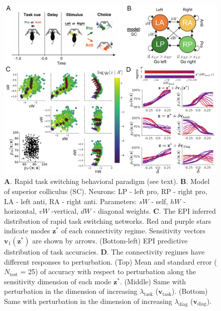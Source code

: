 \documentclass[11pt]{article}
\begin{document}
\begin{figure}
\begin{center}
\includegraphics[scale=0.8]{figures/fig3/fig3.pdf}
\end{center}
\caption{\footnotesize 
\textbf{A}. Rapid task switching behavioral paradigm (see text). 
\textbf{B}. Model of superior colliculus (SC). Neurons: LP - left pro, RP - right pro, LA - left anti, RA - right anti. 
Parameters: $sW$ - self, $hW$ - horizontal, $vW$ -vertical, $dW$ - diagonal weights.  
\textbf{C}. The EPI inferred distribution of rapid task switching networks.  
Red and purple stars indicate modes $\mathbf{z}^*$ of each connectivity regime.
Sensitivity vectors $\mathbf{v}_1(\mathbf{z}^*)$ are shown by arrows.
(Bottom-left) EPI predictive distribution of task accuracies.
\textbf{D}. The connectivity regimes have different responses to perturbation.
(Top) Mean and standard error ($N_{\text{test}}$ = 25) of accuracy with respect to perturbation along the sensitivity dimension of each mode $\mathbf{z}^*$.
(Middle) Same with perturbation in the dimension of increasing $\lambda_{\text{task}}$ ($\mathbf{v}_{\text{task}}$).
(Bottom) Same with perturbation in the dimension of increasing $\lambda_{\text{diag}}$ ($\mathbf{v}_{\text{diag}}$).
}
\label{fig:SC}
\end{figure}
\end{document}
